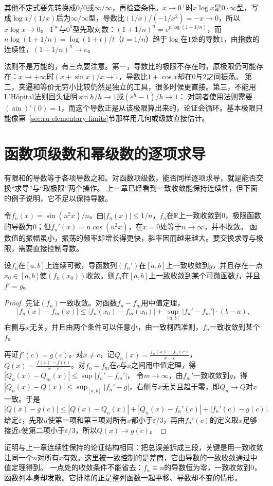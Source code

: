 其他不定式要先转换成$0/0$或$\infty/\infty$，再检查条件。$x\to0^+$时$x\log x$是$0\cdot\infty$型，写成$\log x/(1/x)$后为$\infty/\infty$型，导数比$(1/x)/(-1/x^2)=-x\to0$，所以$x\log x\to0$。
$1^\infty$与$0^0$型先取对数：$(1+1/n)^n=e^{n\log(1+1/n)}$，而$n\log(1+1/n)=\log(1+t)/t$（$t=1/n$）趋于$\log$在$1$处的导数$1$，由指数的连续性，$(1+1/n)^n\to e$。

法则不是万能的，有三点要注意。第一，导数比的极限不存在时，原极限仍可能存在：$x\to+\infty$时$(x+\sin x)/x\to1$，导数比$1+\cos x$却在$0$与$2$之间振荡。
第二，夹逼和等价无穷小比较仍然是独立的工具，很多时候更直接。第三，不能用L'Hôpital法则回头证明$\sin h/h\to1$或$(e^h-1)/h\to1$：
对前者使用法则需要$(\sin)'(0)=1$，而这个导数正是从该极限算出来的，论证会循环。基本极限只能像第~\ref{sec:ru-elementary-limits}节那样用几何或级数直接估计。
\section{函数项级数和幂级数的逐项求导}
\label{sec:ru-termwise-differentiation}

有限和的导数等于各项导数之和。对函数项级数，能否同样逐项求导，就是能否交换“求导”与“取极限”两个操作。
上一章已经看到一致收敛能保持连续性，但下面的例子说明，它不足以保持导数。

令$f_n(x)=\sin(n^2x)/n$。由$|f_n(x)|\leq1/n$，$f_n$在$\mathbb R$上一致收敛到$0$，极限函数的导数为$0$；但$f_n'(x)=n\cos(n^2x)$，在$x=0$处等于$n\to\infty$，并不收敛。
函数值的振幅虽小，振荡的频率却增长得更快，斜率因而越来越大。要交换求导与极限，需要直接控制导数。
\begin{theorem}[函数列的求导与极限交换]
\label{thm:ru-uniform-derivative-limit}
设$f_n$在$[a,b]$上连续可微，导函数列$(f_n')$在$[a,b]$上一致收敛到$g$，并且存在一点$x_0\in[a,b]$使$(f_n(x_0))$收敛。则$f_n$在$[a,b]$上一致收敛到某个可微函数$f$，并且$f'=g$。
\end{theorem}
\begin{proof}
先证$(f_n)$一致收敛。对函数$f_n-f_m$用中值定理，
\[
 |f_n(x)-f_m(x)|\leq|f_n(x_0)-f_m(x_0)|+\sup_{[a,b]}|f_n'-f_m'|\cdot(b-a),
\]
右侧与$x$无关，并且由两个条件可以任意小，由一致柯西准则，$f_n$一致收敛到某个$f$。

再证$f'(c)=g(c)$。对$x\neq c$，记$Q_n(x)=\frac{f_n(x)-f_n(c)}{x-c}$，$Q(x)=\frac{f(x)-f(c)}{x-c}$。对$f_n-f_m$在$c$与$x$之间用中值定理，得$|Q_n(x)-Q_m(x)|\leq\sup|f_n'-f_m'|$，
令$m\to\infty$，由$f_m'$一致收敛到$g$，得$|Q_n(x)-Q(x)|\leq\sup_{[a,b]}|f_n'-g|$，右侧与$x$无关且趋于零，即$Q_n\to Q$对$x$一致。于是
\[
 |Q(x)-g(c)|\leq|Q(x)-Q_n(x)|+|Q_n(x)-f_n'(c)|+|f_n'(c)-g(c)|.
\]
给定$\varepsilon$，先取$n$使第一项和第三项对所有$x$都小于$\varepsilon/3$，再由$f_n'(c)$的定义取$x$足够接近$c$使第二项小于$\varepsilon/3$，所以$Q(x)\to g(c)$。
\end{proof}
证明与上一章连续性保持的论证结构相同：把总误差拆成三段，关键是用一致收敛让同一个$n$对所有$x$有效。这里被一致控制的是差商，它由导数的一致收敛通过中值定理得到。
一点处的收敛条件不能省去：$f_n\equiv n$的导数恒为零，一致收敛到$0$，函数列本身却发散。它排除的正是整列函数一起平移、导数却不变的情形。

